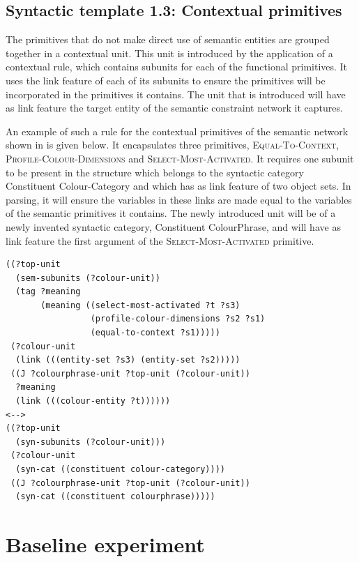 \subsection{Syntactic template 1.3: Contextual primitives}
\label{s:bcs-contextual-primitive}

The primitives that do not make direct use of semantic entities are
grouped together in a contextual unit. This unit is introduced
by the application of a contextual rule, which contains
subunits for each of the functional primitives. It uses the link
feature of each of its subunits to ensure the primitives will be
incorporated in the primitives it contains. The unit that is
introduced will have as link feature the target entity of the semantic
constraint network it captures.

An example of such a rule for the contextual primitives of the
semantic network shown in  is
given below. It encapsulates three primitives,
\textsc{Equal-To-Context}, \textsc{Profile-Colour-Dimensions} and
\textsc{Select-Most-Activated}. It requires one subunit to be present
in the structure which belongs to the syntactic category Constituent
Colour-Category and which has as link feature of two object sets. In
parsing, it will ensure the variables in these links are made equal to
the variables of the semantic primitives it contains. The newly
introduced unit will be of a newly invented syntactic category,
Constituent ColourPhrase, and will have as link feature the first
argument of the \textsc{Select-Most-Activated} primitive.

\footnotesize
{}
\begin{lstlisting}
((?top-unit
  (sem-subunits (?colour-unit))
  (tag ?meaning
       (meaning ((select-most-activated ?t ?s3)
                 (profile-colour-dimensions ?s2 ?s1)
                 (equal-to-context ?s1)))))
 (?colour-unit
  (link (((entity-set ?s3) (entity-set ?s2)))))
 ((J ?colourphrase-unit ?top-unit (?colour-unit))
  ?meaning
  (link (((colour-entity ?t))))))
<-->
((?top-unit 
  (syn-subunits (?colour-unit)))
 (?colour-unit 
  (syn-cat ((constituent colour-category))))
 ((J ?colourphrase-unit ?top-unit (?colour-unit))
  (syn-cat ((constituent colourphrase)))))
\end{lstlisting}
\normalsize

\section{Baseline experiment}
\label{s:basic-baseline-experiment}

